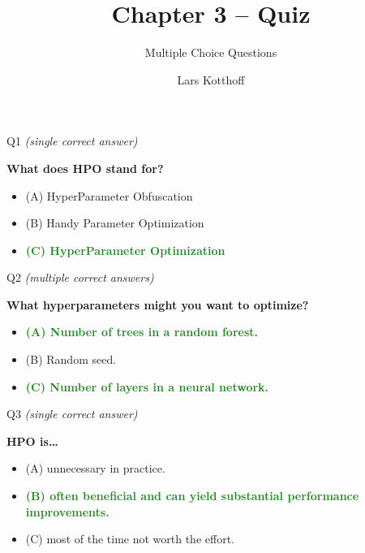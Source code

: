 \documentclass[main]{subfiles}
\title[AutoML: Introduction]{Chapter 3 -- Quiz}
\subtitle{Multiple Choice Questions}
\author[Lars Kotthoff]{Lars Kotthoff}
\date{}
\newcommand{\correct}[1]{\textcolor{ForestGreen}{\textbf{#1} \checkmark}}
\newcommand{\wrong}[1]{#1}
\begin{document}
    \maketitle


\begin{frame}{Q1 \hfill \small\normalfont\textit{(single correct answer)}}

\textbf{What does HPO stand for?}

\begin{itemize}
    \item \wrong{(A) \; HyperParameter Obfuscation}
    \item \wrong{(B) \; Handy Parameter Optimization}
    \item \correct{(C) \; HyperParameter Optimization}
\end{itemize}

\end{frame}

\begin{frame}{Q2 \hfill \small\normalfont\textit{(multiple correct answers)}}

\textbf{What hyperparameters might you want to optimize?}

\begin{itemize}
    \item \correct{(A) \; Number of trees in a random forest.}
    \item \wrong{(B) \; Random seed.}
    \item \correct{(C) \; Number of layers in a neural network.}
\end{itemize}

\end{frame}

\begin{frame}{Q3 \hfill \small\normalfont\textit{(single correct answer)}}

\textbf{HPO is\ldots{}}

\begin{itemize}
    \item \wrong{(A) \; unnecessary in practice.}
    \item \correct{(B) \; often beneficial and can yield substantial performance improvements.}
    \item \wrong{(C) \; most of the time not worth the effort.}
\end{itemize}

\end{frame}
\end{document}
